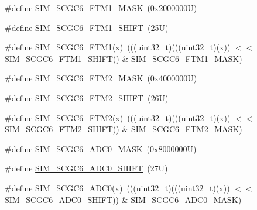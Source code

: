\begin{DoxyCompactItemize}
\item 
\#define \mbox{\hyperlink{group___s_i_m___register___masks_gacd8912282b78e6b939981ce4c313065f}{S\+I\+M\+\_\+\+S\+C\+G\+C6\+\_\+\+F\+T\+M1\+\_\+\+M\+A\+SK}}~(0x2000000\+U)
\item 
\#define \mbox{\hyperlink{group___s_i_m___register___masks_gaabc95256d64e237982e5b6d15ad53e89}{S\+I\+M\+\_\+\+S\+C\+G\+C6\+\_\+\+F\+T\+M1\+\_\+\+S\+H\+I\+FT}}~(25\+U)
\item 
\#define \mbox{\hyperlink{group___s_i_m___register___masks_ga16cfb585b192bfbbe7ea3411c58d7f32}{S\+I\+M\+\_\+\+S\+C\+G\+C6\+\_\+\+F\+T\+M1}}(x)~(((uint32\+\_\+t)(((uint32\+\_\+t)(x)) $<$$<$ \mbox{\hyperlink{group___s_i_m___register___masks_gaabc95256d64e237982e5b6d15ad53e89}{S\+I\+M\+\_\+\+S\+C\+G\+C6\+\_\+\+F\+T\+M1\+\_\+\+S\+H\+I\+FT}})) \& \mbox{\hyperlink{group___s_i_m___register___masks_gacd8912282b78e6b939981ce4c313065f}{S\+I\+M\+\_\+\+S\+C\+G\+C6\+\_\+\+F\+T\+M1\+\_\+\+M\+A\+SK}})
\item 
\#define \mbox{\hyperlink{group___s_i_m___register___masks_ga2113e9cf896870ed64d5e834e030328b}{S\+I\+M\+\_\+\+S\+C\+G\+C6\+\_\+\+F\+T\+M2\+\_\+\+M\+A\+SK}}~(0x4000000\+U)
\item 
\#define \mbox{\hyperlink{group___s_i_m___register___masks_ga41f5057add5cbd83e8a1c29fd33daa64}{S\+I\+M\+\_\+\+S\+C\+G\+C6\+\_\+\+F\+T\+M2\+\_\+\+S\+H\+I\+FT}}~(26\+U)
\item 
\#define \mbox{\hyperlink{group___s_i_m___register___masks_ga43b21a2d04105242a3569ae4848d7376}{S\+I\+M\+\_\+\+S\+C\+G\+C6\+\_\+\+F\+T\+M2}}(x)~(((uint32\+\_\+t)(((uint32\+\_\+t)(x)) $<$$<$ \mbox{\hyperlink{group___s_i_m___register___masks_ga41f5057add5cbd83e8a1c29fd33daa64}{S\+I\+M\+\_\+\+S\+C\+G\+C6\+\_\+\+F\+T\+M2\+\_\+\+S\+H\+I\+FT}})) \& \mbox{\hyperlink{group___s_i_m___register___masks_ga2113e9cf896870ed64d5e834e030328b}{S\+I\+M\+\_\+\+S\+C\+G\+C6\+\_\+\+F\+T\+M2\+\_\+\+M\+A\+SK}})
\item 
\#define \mbox{\hyperlink{group___s_i_m___register___masks_ga481c725e02da6a245c9d715307969f09}{S\+I\+M\+\_\+\+S\+C\+G\+C6\+\_\+\+A\+D\+C0\+\_\+\+M\+A\+SK}}~(0x8000000\+U)
\item 
\#define \mbox{\hyperlink{group___s_i_m___register___masks_ga3f62de5fc5ccaa13d6975cf1e0ebba03}{S\+I\+M\+\_\+\+S\+C\+G\+C6\+\_\+\+A\+D\+C0\+\_\+\+S\+H\+I\+FT}}~(27\+U)
\item 
\#define \mbox{\hyperlink{group___s_i_m___register___masks_ga4a3fd4d8007ac2ce1bbb95fa569bcdb4}{S\+I\+M\+\_\+\+S\+C\+G\+C6\+\_\+\+A\+D\+C0}}(x)~(((uint32\+\_\+t)(((uint32\+\_\+t)(x)) $<$$<$ \mbox{\hyperlink{group___s_i_m___register___masks_ga3f62de5fc5ccaa13d6975cf1e0ebba03}{S\+I\+M\+\_\+\+S\+C\+G\+C6\+\_\+\+A\+D\+C0\+\_\+\+S\+H\+I\+FT}})) \& \mbox{\hyperlink{group___s_i_m___register___masks_ga481c725e02da6a245c9d715307969f09}{S\+I\+M\+\_\+\+S\+C\+G\+C6\+\_\+\+A\+D\+C0\+\_\+\+M\+A\+SK}})
$$
\end{DoxyCompactItemize}
